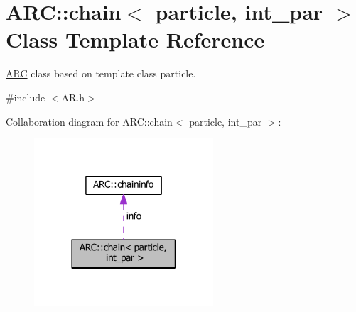 \hypertarget{classARC_1_1chain}{}\section{A\+RC\+:\+:chain$<$ particle, int\+\_\+par $>$ Class Template Reference}
\label{classARC_1_1chain}


\hyperlink{namespaceARC}{A\+RC} class based on template class particle.  




{\ttfamily \#include $<$A\+R.\+h$>$}



Collaboration diagram for A\+RC\+:\+:chain$<$ particle, int\+\_\+par $>$\+:
\nopagebreak
\begin{figure}[H]
\begin{center}
\leavevmode
\includegraphics[width=189pt]{classARC_1_1chain__coll__graph}
\end{center}
\end{figure}
